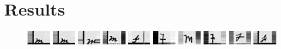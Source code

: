 \section{Results}

\begin{figure}[ht]
  \begin{center}
      \includegraphics[width=0.09\textwidth]{images/Subimages/Good/004531795_00006-3.png}
      \includegraphics[width=0.09\textwidth]{images/Subimages/Good/004531795_00006-3.png}
      \includegraphics[width=0.09\textwidth]{images/Subimages/Good/004531795_00006-5.png}
      \includegraphics[width=0.09\textwidth]{images/Subimages/Good/004531795_00009-60.png}
      \includegraphics[width=0.09\textwidth]{images/Subimages/Good/004531795_00009-80.png}
      \includegraphics[width=0.09\textwidth]{images/Subimages/Good/004531795_00195-67.png}
      \includegraphics[width=0.09\textwidth]{images/Subimages/Good/004531795_00195-72.png}
      \includegraphics[width=0.09\textwidth]{images/Subimages/Good/004531795_00195-91.png}
      \includegraphics[width=0.09\textwidth]{images/Subimages/Good/004531795_00439-74.png}
      \includegraphics[width=0.09\textwidth]{images/Subimages/Good/004531795_00009-59.png}

\end{center}
\end{figure}

